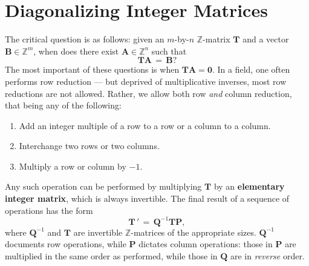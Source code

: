 \documentclass[11pt]{article}
\renewcommand{\vec}[1]{\mathbf{#1}}
\newcommand{\mat}[1]{\mathbf{#1}}
\begin{document}



%


\section{Diagonalizing Integer Matrices}

The critical question is as follows: given an $m$-by-$n$ $\mathbb{Z}$-matrix $\mat{T}$ and a vector $\vec{B} \in \mathbb{Z}^{m}$, when does there exist $\vec{A} \in \mathbb{Z}^{n}$ such that
\[
  \mat{T}\vec{A} \, = \, \vec{B}?
\]
The most important of these questions is when $\mat{T} \vec{A} = \vec{0}$. In a field, one often performs row reduction --- but deprived of multiplicative inverses, most row reductions are not allowed. Rather, we allow both row \textit{and} column reduction, that being any of the following:
\begin{enumerate}
  \item Add an integer multiple of a row to a row or a column to a column.
  \item Interchange two rows or two columns.
  \item Multiply a row or column by $-1$.
\end{enumerate}

Any such operation can be performed by multiplying $\mat{T}$ by an \textbf{elementary integer matrix}, which is always invertible. The final result of a sequence of operations has the form
\[
  \mat{T} \, ' \, = \, \mat{Q}^{-1} \mat{T} \mat{P},
\]
where $\mat{Q}^{-1}$ and $\mat{T}$ are invertible $\mathbb{Z}$-matrices of the appropriate sizes. $\mat{Q}^{-1}$ documents row operations, while $\mat{P}$ dictates column operations: those in $\mat{P}$ are multiplied in the same order as performed, while those in $\mat{Q}$ are in \textit{reverse} order.
\end{document}
